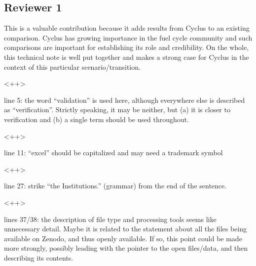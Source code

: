 \documentclass[answers,11pt]{exam}
\begin{document}
\begin{questions}
\section*{Reviewer 1}

        \question This is a valuable contribution because it adds results from 
        Cyclus to an existing comparison.  Cyclus has growing importance in the 
        fuel cycle community and such comparisons are important for 
        establishing its role and credibility.  On the whole, this technical 
        note is well put together and makes a strong case for Cyclus in the 
        context of this particular scenario/transition.

        \begin{solution}
        <++>
        \end{solution}

        \question line 5: the word ``validation'' is used here, although 
        everywhere else is described as ``verification''.  Strictly speaking, 
        it may be neither, but (a) it is closer to verification and (b) a 
        single term should be used throughout.

        \begin{solution}
        <++>
        \end{solution}

        \question line 11: ``excel'' should be capitalized and may need a 
        trademark symbol

        \begin{solution}
        <++>
        \end{solution}

        \question line 27: strike ``the Institutions.'' (grammar) from the end 
        of the sentence.

        \begin{solution}
        <++>
        \end{solution}

        \question lines 37/38: the description of file type and processing 
        tools seems like unnecessary detail.  Maybe it is related to the 
        statement about all the files being available on Zenodo, and thus 
        openly available.  If so, this point could be made more strongly, 
        possibly leading with the pointer to the open files/data, and then 
        describing its contents.


\end{questions}
\end{document}
